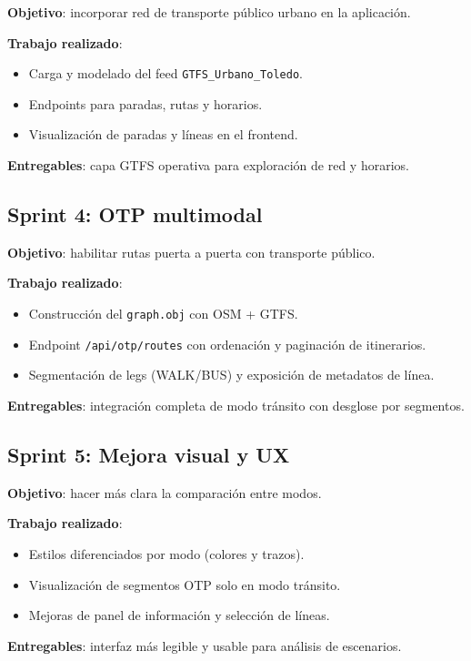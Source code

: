 \textbf{Objetivo}: incorporar red de transporte público urbano en la aplicación.

\textbf{Trabajo realizado}:
\begin{itemize}
  \item Carga y modelado del feed \texttt{GTFS\_Urbano\_Toledo}.
  \item Endpoints para paradas, rutas y horarios.
  \item Visualización de paradas y líneas en el frontend.
\end{itemize}

\textbf{Entregables}: capa GTFS operativa para exploración de red y horarios.

\subsection{Sprint 4: OTP multimodal}

\textbf{Objetivo}: habilitar rutas puerta a puerta con transporte público.

\textbf{Trabajo realizado}:
\begin{itemize}
  \item Construcción del \texttt{graph.obj} con OSM + GTFS.
  \item Endpoint \texttt{/api/otp/routes} con ordenación y paginación de itinerarios.
  \item Segmentación de legs (WALK/BUS) y exposición de metadatos de línea.
\end{itemize}

\textbf{Entregables}: integración completa de modo tránsito con desglose por segmentos.

\subsection{Sprint 5: Mejora visual y UX}

\textbf{Objetivo}: hacer más clara la comparación entre modos.

\textbf{Trabajo realizado}:
\begin{itemize}
  \item Estilos diferenciados por modo (colores y trazos).
  \item Visualización de segmentos OTP solo en modo tránsito.
  \item Mejoras de panel de información y selección de líneas.
\end{itemize}

\textbf{Entregables}: interfaz más legible y usable para análisis de escenarios.

